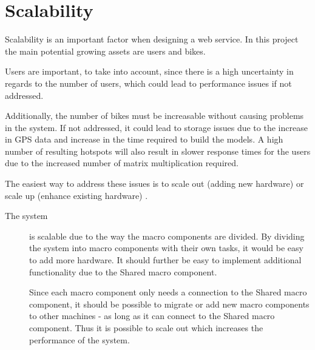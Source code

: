 \section{Scalability}
Scalability is an important factor when designing a web service. In this project the main potential growing assets are users and bikes.

Users are important, to take into account, since there is a high uncertainty in regards to the number of users, which could lead to performance issues if not addressed.

Additionally, the number of bikes must be increasable without causing problems in the system. If not addressed, it could lead to storage issues due to the increase in GPS data and increase in the time required to build the models.
A high number of resulting hotspots will also result in slower response times for the users due to the increased number of matrix multiplication required.

The easiest way to address these issues is to scale out (adding new hardware) or scale up (enhance existing hardware) \cite{michael2007scale}. 

\begin{description}
\item[The system] is scalable due to the way the macro components are divided. By dividing the system into macro components with their own tasks, it would be easy to add more hardware. It should further be easy to implement additional functionality due to the Shared macro component.

Since each macro component only needs a connection to the Shared macro component, it should be possible to migrate or add new macro components to other machines - as long as it can connect to the Shared macro component.
Thus it is possible to scale out which increases the performance of the system.
\end{description}